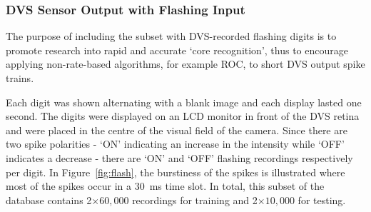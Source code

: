 %
%
%
%


\subsubsection{DVS Sensor Output with Flashing Input}
\label{subsec_flash}
The purpose of including the subset with DVS-recorded flashing digits is to promote research into rapid and accurate `core recognition', thus to encourage applying non-rate-based algorithms, for example ROC, to short DVS output spike trains.

Each digit was shown alternating with a blank image and each display lasted one second.
The digits were displayed on an LCD monitor in front of the DVS retina~\cite{serrano2013128} and were placed in the centre of the visual field of the camera.
Since there are two spike polarities - `ON' indicating an increase in the intensity while `OFF' indicates a decrease - there are `ON' and `OFF' flashing recordings respectively per digit.
In Figure~\ref{fig:flash}, the burstiness of the spikes is illustrated where most of the spikes occur in a 30~ms time slot. 
In total, this subset of the database contains 2$\times$$60,000$ recordings for training and 2$\times$$10,000$ for testing.

